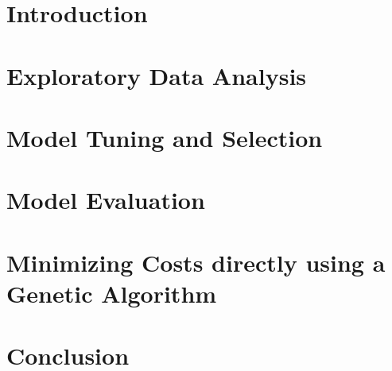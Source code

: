 \documentclass{article}
\begin{document}
\section{Introduction}


\section{Exploratory Data Analysis}


\section{Model Tuning and Selection}


\section{Model Evaluation}


\section{Minimizing Costs directly using a Genetic Algorithm}


\section{Conclusion}

\end{document}
